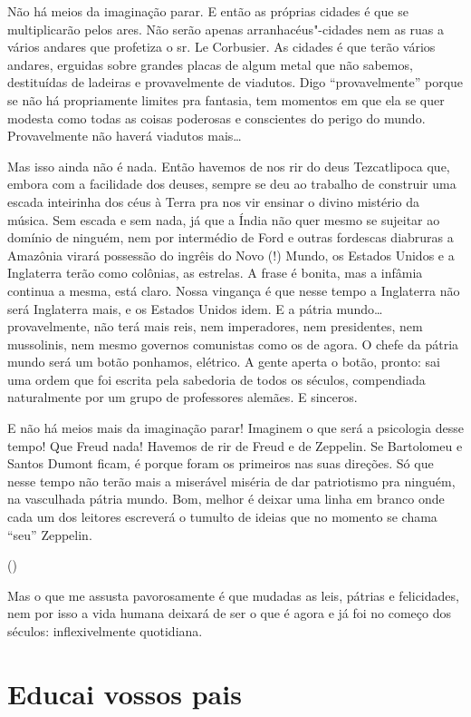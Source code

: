 Não há meios da imaginação parar. E então as próprias cidades é que se
multiplicarão pelos ares. Não serão apenas arranhacéus"-cidades nem as
ruas a vários andares que profetiza o sr. Le Corbusier. As cidades é que
terão vários andares, erguidas sobre grandes placas de algum metal que
não sabemos, destituídas de ladeiras e provavelmente de viadutos. Digo
``provavelmente'' porque se não há propriamente limites pra fantasia,
tem momentos em que ela se quer modesta como todas as coisas poderosas e
conscientes do perigo do mundo. Provavelmente não haverá viadutos
mais\ldots{}

Mas isso ainda não é nada. Então havemos de nos rir do deus Tezcatlipoca
que, embora com a facilidade dos deuses, sempre se deu ao trabalho de
construir uma escada inteirinha dos céus à Terra pra nos vir ensinar o
divino mistério da música. Sem escada e sem nada, já que a Índia não
quer mesmo se sujeitar ao domínio de ninguém, nem por intermédio de Ford
e outras fordescas diabruras a Amazônia virará possessão do ingrêis do
Novo (!) Mundo, os Estados Unidos e a Inglaterra terão como colônias, as
estrelas. A frase é bonita, mas a infâmia continua a mesma, está claro.
Nossa vingança é que nesse tempo a Inglaterra não será Inglaterra mais,
e os Estados Unidos idem. E a pátria mundo\ldots{} provavelmente, não terá
mais reis, nem imperadores, nem presidentes, nem mussolinis, nem mesmo
governos comunistas como os de agora. O chefe da pátria mundo será um
botão ponhamos, elétrico. A gente aperta o botão, pronto: sai uma ordem
que foi escrita pela sabedoria de todos os séculos, compendiada
naturalmente por um grupo de professores alemães. E sinceros.

E não há meios mais da imaginação parar! Imaginem o que será a
psicologia desse tempo! Que Freud nada! Havemos de rir de Freud e de
Zeppelin. Se Bartolomeu e Santos Dumont ficam, é porque foram os
primeiros nas suas direções. Só que nesse tempo não terão mais a
miserável miséria de dar patriotismo pra ninguém, na vasculhada pátria
mundo. Bom, melhor é deixar uma linha em branco onde cada um dos
leitores escreverá o tumulto de ideias que no momento se chama ``seu''
Zeppelin.

\noindent(\dotfill{})

Mas o que me assusta pavorosamente é que mudadas as leis, pátrias e
felicidades, nem por isso a vida humana deixará de ser o que é agora e
já foi no começo dos séculos: inflexivelmente quotidiana.

\chapter{Educai vossos pais}

